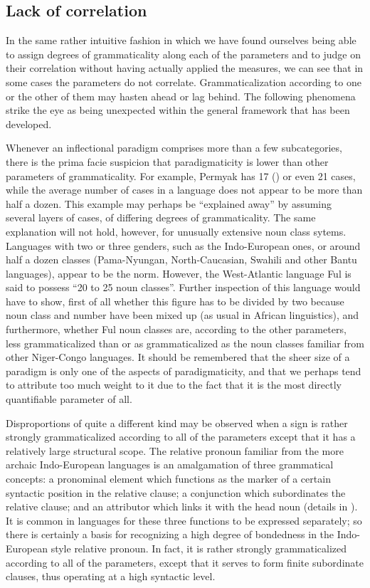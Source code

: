 \subsection{Lack of correlation} \label{sec:4.4.3}

In the same rather intuitive fashion in which we have found ourselves being able to assign degrees of grammaticality along each of the parameters and to judge on their correlation without having actually applied the measures, we can see that in some cases the parameters do not correlate. Grammaticalization according to one or the other of them may hasten ahead or lag behind. The following phenomena strike the eye as being unexpected within the general framework that has been developed.

Whenever an inflectional paradigm comprises more than a few subcategories, there is the prima facie suspicion that paradigmaticity is lower than other parameters of grammaticality. For example, Permyak has 17 (\citealt[119]{Comrie1981a}) or even 21 \citep[238]{Austerlitz1980} cases, while the average number of cases in a language does not appear to be more than half a dozen. This example may perhaps be “explained away” by assuming several layers of cases, of differing degrees of grammaticality. The same explanation will not hold, however, for unusually extensive noun class sytems. Languages with two or three genders, such as the Indo-European ones, or around half a dozen classes (Pama-Nyungan, North-Caucasian, Swahili and other Bantu languages), appear to be the norm. However, the West-Atlantic language Ful is said \citep[51]{HeineEtAl1981} to possess “20 to 25 noun classes”. Further inspection of this language would have to show, first of all whether this figure has to be divided by two because noun class and number have been mixed up (as usual in African linguistics), and furthermore, whether Ful noun classes are, according to the other parameters, less grammaticalized than or as grammaticalized as the noun classes familiar from other Niger-Congo languages. It should be remembered that the sheer size of a paradigm is only one of the aspects of paradigmaticity, and that we perhaps tend to attribute too much weight to it due to the fact that it is the most directly quantifiable parameter of all.

Disproportions of quite a different kind may be observed when a sign is rather strongly grammaticalized according to all of the parameters except that it has a relatively large structural scope. The relative pronoun familiar from the more archaic Indo-European languages is an amalgamation of three grammatical concepts: a pronominal element which functions as the marker of a certain syntactic position in the relative clause; a conjunction which subordinates the relative clause; and an attributor which links it with the head noun (details in \citealt[Ch.~\textsc{iv}.4]{Lehmann1984}). It is common in languages for these three functions to be expressed separately; so there is certainly a basis for recognizing a high degree of bondedness in the Indo-European style relative pronoun. In fact, it is rather strongly grammaticalized according to all of the parameters, except that it serves to form finite subordinate clauses, thus operating at a high syntactic level.

